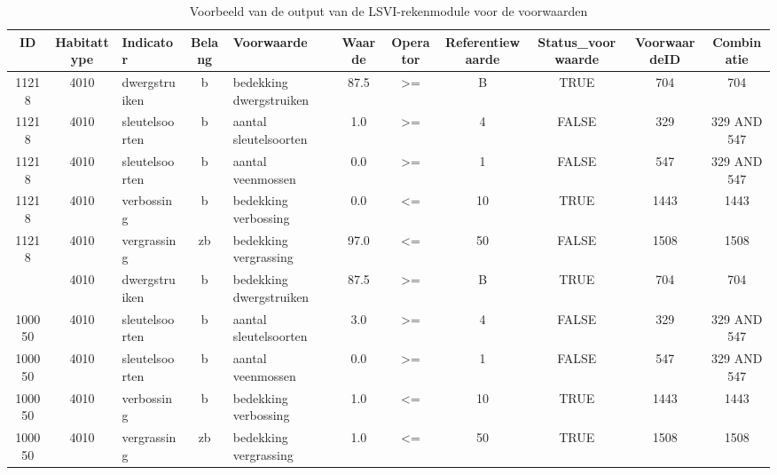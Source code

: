 \documentclass[twoside]{extreport}
\begin{document}
\begin{landscape}\begin{table}[!h]

\caption{\label{tab:tabelVoorwaarden}Voorbeeld van de output van de LSVI-rekenmodule voor de voorwaarden}
\centering
\fontsize{9}{11}\selectfont
\begin{tabular}[t]{cclclcccccc}
\toprule
ID & Habitattype & Indicator & Belang & Voorwaarde & Waarde & Operator & Referentiewaarde & Status\_voorwaarde & VoorwaardeID & Combinatie\\
\midrule
11218 & 4010 & dwergstruiken & b & bedekking dwergstruiken & 87.5 & >= & B & TRUE & 704 & 704\\
11218 & 4010 & sleutelsoorten & b & aantal sleutelsoorten & 1.0 & >= & 4 & FALSE & 329 & 329 AND 547\\
11218 & 4010 & sleutelsoorten & b & aantal veenmossen & 0.0 & >= & 1 & FALSE & 547 & 329 AND 547\\
11218 & 4010 & verbossing & b & bedekking verbossing & 0.0 & <= & 10 & TRUE & 1443 & 1443\\
11218 & 4010 & vergrassing & zb & bedekking vergrassing & 97.0 & <= & 50 & FALSE & 1508 & 1508\\
\addlinespace
100050 & 4010 & dwergstruiken & b & bedekking dwergstruiken & 87.5 & >= & B & TRUE & 704 & 704\\
100050 & 4010 & sleutelsoorten & b & aantal sleutelsoorten & 3.0 & >= & 4 & FALSE & 329 & 329 AND 547\\
100050 & 4010 & sleutelsoorten & b & aantal veenmossen & 0.0 & >= & 1 & FALSE & 547 & 329 AND 547\\
100050 & 4010 & verbossing & b & bedekking verbossing & 1.0 & <= & 10 & TRUE & 1443 & 1443\\
100050 & 4010 & vergrassing & zb & bedekking vergrassing & 1.0 & <= & 50 & TRUE & 1508 & 1508\\
\bottomrule
\end{tabular}
\end{table}
\end{landscape}
\end{document}
